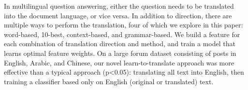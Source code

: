 In multilingual question answering, either the question needs to be translated into the document language, or vice versa. In addition to direction, there are multiple ways to perform the translation, four of which we explore in this paper: word-based, 10-best, context-based, and grammar-based. We build a feature for each combination of translation direction and method, and train a model that learns optimal feature weights. On a large forum dataset consisting of posts in English, Arabic, and Chinese, our novel learn-to-translate approach was more effective than a typical approach (p<0.05): translating all text into English, then training a classifier based only on English (original or translated) text.
